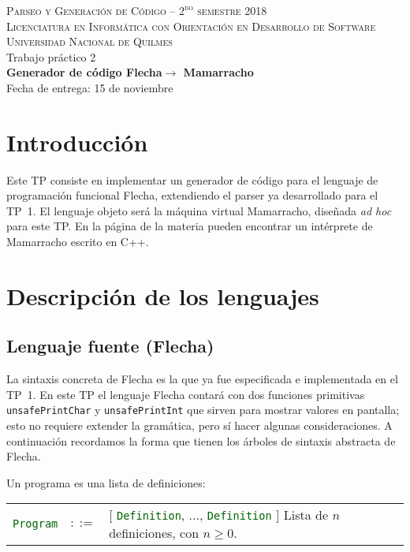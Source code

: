\documentclass{article}
\newcommand{\flecha}{\textsf{Flecha}\xspace}
\newcommand{\mamarracho}{\textsf{Mamarracho}\xspace}
\newcommand{\type}[1]{\textcolor{darkgreen}{\texttt{#1}}}
\newcommand{\datadecl}[2]{\noindent
  \begin{tabularx}{\textwidth}{lrp{13cm}r}
  #1 & $::=$ & #2
  \end{tabularx}\\
}
\begin{document}
\begin{center}
\textsc{{\small Parseo y Generaci\'on de C\'odigo -- $2^{\text{do}}$ semestre 2018}} \medskip \\ 
\textsc{{\small Licenciatura en Inform\'atica con Orientaci\'on en Desarrollo de Software}} \medskip \\
\textsc{{\small Universidad Nacional de Quilmes}} \medskip \\
{\Large Trabajo pr\'actico 2} \medskip \\
{\large {\bf Generador de código \flecha $\to$ \mamarracho}} \medskip \\
\bigskip
Fecha de entrega: 15 de noviembre
\end{center}

\tableofcontents

\section{Introducci\'on}

Este TP consiste en implementar un generador de código
para el lenguaje de programación funcional \flecha,
extendiendo el parser ya desarrollado para el TP~1.
El lenguaje objeto será la máquina
virtual \mamarracho, diseñada {\em ad hoc} para este TP.
En la página de la materia pueden encontrar un intérprete
de \mamarracho escrito en C++.

\section{Descripción de los lenguajes}

\subsection{Lenguaje fuente (\flecha)}

La sintaxis concreta de \flecha es la que ya fue especificada e implementada en el TP~1.
En este TP el lenguaje \flecha contará con dos funciones primitivas
\texttt{unsafePrintChar} y \texttt{unsafePrintInt}
que sirven para mostrar valores en pantalla;
esto no requiere extender la gramática, pero sí
hacer algunas consideraciones.
A continuación recordamos la forma que tienen
los árboles de sintaxis abstracta de \flecha.
\bigskip


\noindent Un programa es una lista de definiciones: \\
\datadecl{\type{Program}}{[
  \type{Definition},
  $\hdots$,
  \type{Definition}
]
\hfill {\small Lista de $n$ definiciones, con $n \geq 0$.}
}
\end{document}
